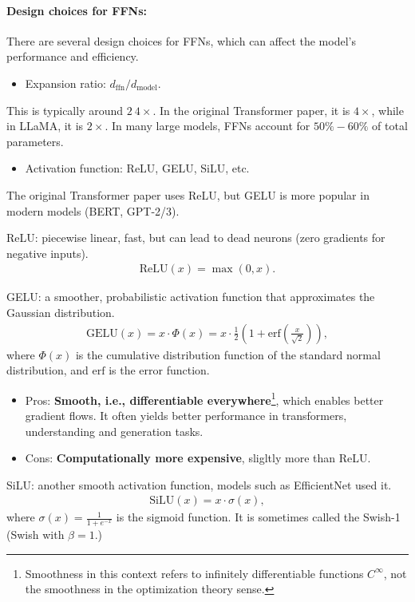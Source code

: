 \documentclass[11pt]{article}  %
\begin{document}
\paragraph{Design choices for FFNs:}
There are several design choices for FFNs, which can affect the model's performance and efficiency.
\begin{itemize}
  \item Expansion ratio: $d_{\text{ffn}}/d_{\text{model}}$.
\end{itemize}
This is typically around $2 ~ 4 \times$.
In the original Transformer paper, it is $4 \times$, while in LLaMA, it is $2 \times$.
In many large models, FFNs account for $50\% - 60\%$ of total parameters.

\begin{itemize}
  \item Activation function: ReLU, GELU, SiLU, etc.
\end{itemize}
The original Transformer paper uses ReLU, but GELU is more popular in modern models (BERT, GPT-2/3).

ReLU: piecewise linear, fast, but can lead to dead neurons (zero gradients for negative inputs). 
\begin{align*}
  \text{ReLU}(x) = \max(0, x).
\end{align*}

GELU: a smoother, probabilistic activation function that approximates the Gaussian distribution.
\begin{align*}
  \text{GELU}(x) = x \cdot \Phi(x) = x \cdot \frac{1}{2}\left(1 + \text{erf}\left(\frac{x}{\sqrt{2}}\right)\right),
\end{align*}
where $\Phi(x)$ is the cumulative distribution function of the standard normal distribution, and $\text{erf}$ is the error function.
\begin{itemize}
  \item Pros: \textbf{Smooth, i.e., differentiable everywhere}\footnote{Smoothness in this context refers to infinitely differentiable functions $C^{\infty}$, not the smoothness in the optimization theory sense.}, which enables better gradient flows. It often yields better performance in transformers, understanding and generation tasks.
  \item Cons: \textbf{Computationally more expensive}, sligltly more than ReLU.
\end{itemize}

SiLU: another smooth activation function, models such as EfficientNet used it. 
\begin{align*}
  \text{SiLU}(x) = x \cdot \sigma(x),
\end{align*}
where $\sigma(x) = \frac{1}{1 + e^{-x}}$ is the sigmoid function.
It is sometimes called the Swish-1 (Swish with $\beta = 1$.)
\end{document}
